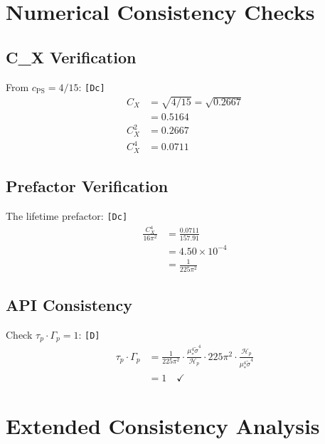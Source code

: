 \documentclass[11pt,a4paper]{article}
\newcommand{\tagD}{\textcolor{green!50!black}{\texttt{[D]}}}
\newcommand{\tagDc}{\textcolor{blue!70!black}{\texttt{[Dc]}}}
\theoremstyle{definition}
\begin{document}
\section{Numerical Consistency Checks}
\label{app:numerical}

\subsection{C\_X Verification}
\label{app:cx-verify}

From $c_{\text{PS}} = 4/15$: \tagDc{}
\begin{align}
\label{eq:app-cx-1}
C_X &= \sqrt{4/15} = \sqrt{0.2667} \\
\label{eq:app-cx-2}
&= 0.5164 \\
\label{eq:app-cx-3}
C_X^2 &= 0.2667 \\
\label{eq:app-cx-4}
C_X^4 &= 0.0711
\end{align}

\subsection{Prefactor Verification}
\label{app:prefactor-verify}

The lifetime prefactor: \tagDc{}
\begin{align}
\label{eq:app-pf-1}
\frac{C_X^4}{16\pi^2} &= \frac{0.0711}{157.91} \\
\label{eq:app-pf-2}
&= 4.50 \times 10^{-4} \\
\label{eq:app-pf-3}
&= \frac{1}{225\pi^2}
\end{align}

\subsection{API Consistency}
\label{app:api-verify}

Check $\tau_p \cdot \Gamma_p = 1$: \tagD{}
\begin{align}
\label{eq:app-api-1}
\tau_p \cdot \Gamma_p &= \frac{1}{225\pi^2} \cdot \frac{\mu_*^4 \tilde{\sigma}^4}{\mathcal{H}_p} \cdot 225\pi^2 \cdot \frac{\mathcal{H}_p}{\mu_*^4 \tilde{\sigma}^4} \\
\label{eq:app-api-2}
&= 1 \quad \checkmark
\end{align}

\section{Extended Consistency Analysis}
\label{app:extended}
\end{document}
